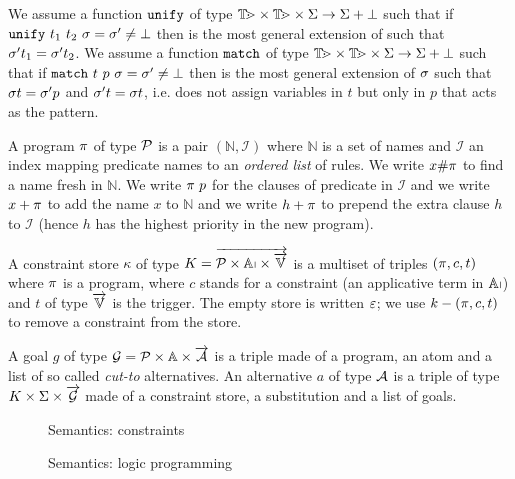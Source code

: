 \documentclass[a4paper, 11pt]{book}
\begin{document}
We assume a function $\unify$ of type $\TERM \times \TERM \times \Sigma \to \Sigma + \bot$
such that if $\unifyCmd{t_1}{t_2}{\subst}{\subst[']} \not= \bot$ 
then \subst['] is the most general extension of \subst 
such that $\subst['] t_1 = \subst['] t_2$.
We assume a function $\match$ of type $\TERM \times \TERM \times \Sigma \to \Sigma + \bot$
such that if $\matchCmd{t}{p}{\subst}{\subst[']} \not= \bot$
then \subst[']  is the most general extension of  $\subst$
such that $\subst t = \subst['] p$ and $\subst[']t = \subst t$,
i.e. \match{} does not assign variables in $t$ but only in $p$ that acts as the pattern.

A program $\prog$ of type $\PROG$ is a pair $(\mathbb{N}, \mathcal{I})$
where $\mathbb{N}$ is a set of names and $\mathcal{I}$ an index
mapping predicate names to an \emph{ordered list} of rules.
We write $x \# \prog$ to find a name fresh in $\mathbb{N}$.
We write $\prog~\pred$ for the clauses of predicate \pred in $\mathcal{I}$
and we write $x + \prog$ to add the name $x$ to $\mathbb{N}$
and we write $h + \prog$ to prepend the extra clause $h$  to $\mathcal{I}$
(hence $h$ has the highest priority in the new program).

A constraint store $\kappa$ of type $K = \vecL{\PROG \times \APP \times \vecL{\VAR}}$
is a multiset of triples $(\prog,c,t)$
where $\prog$ is a program, where $c$ stands for a constraint (an applicative term in $\APP$) and $t$
of type $\vecL{\VAR}$ is the trigger. The empty store is written $\EmptySubst$;
we use $k - (\prog,c,t)$ to remove a constraint from the store.

A goal $g$ of type $\g = \PROG \times \ATOM \times \vecL{\alt}$
is a triple made of a program, an atom and a list of
so called \emph{cut-to} alternatives.
An alternative $a$ of type $\alt$ is a triple of type $K \times \Sigma \times \vecL{\g}$
made of a constraint store, a substitution and a list of goals.

\begin{figure}[!]
    \centering

  \caption{Semantics: constraints}
    \label{fig:basic-interp-c}
\end{figure}

  \begin{figure}[!]
  \centering
%


  
  \caption{Semantics: logic programming}
    \label{fig:basic-interp-l}
\end{figure}
\end{document}
